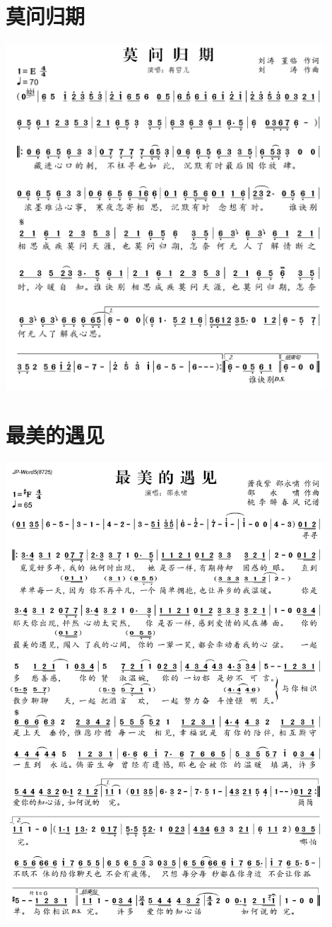 \documentclass[cn,pad,twocol]{elegantbook}
\begin{document}
\section{莫问归期} \includegraphics[width=0.9\textwidth]{macos/2020莫问归期.png}
\section{最美的遇见} \includegraphics[width=0.9\textwidth]{macos/2020最美的遇见.png}
\end{document}
